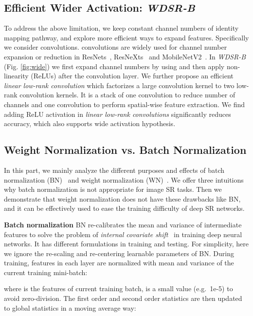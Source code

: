 \documentclass{article}
\begin{document}
\subsection{Efficient Wider Activation: \textit{WDSR-B}}
To address the above limitation, we keep constant channel numbers of identity mapping pathway, and explore more efficient ways to expand features. Specifically we consider  convolutions.  convolutions are widely used for channel number expansion or reduction in ResNets~\cite{he2016deep}, ResNeXts~\cite{xie2017aggregated} and MobileNetV2~\cite{2018arXiv180104381S}. In \textit{WDSR-B} (Fig. \ref{fig:wide}) we first expand channel numbers by using  and then apply non-linearity (ReLUs) after the convolution layer. We further propose an efficient \textit{linear low-rank convolution} which factorizes a large convolution kernel to two low-rank convolution kernels. It is a stack of one  convolution to reduce number of channels and one  convolution to perform spatial-wise feature extraction. We find adding ReLU activation in \textit{linear low-rank convolutions} significantly reduces accuracy, which also supports wide activation hypothesis.

\subsection{Weight Normalization vs. Batch Normalization}

In this part, we mainly analyze the different purposes and effects of batch normalization (BN)~\cite{ioffe2015batch} and weight normalization (WN)~\cite{salimans2016weight}. We offer three intuitions why batch normalization is not appropriate for image SR tasks. Then we demonstrate that weight normalization does not have these drawbacks like BN, and it can be effectively used to ease the training difficulty of deep SR networks.

\textbf{Batch normalization} BN re-calibrates the mean and variance of intermediate features to solve the problem of \textit{internal covariate shift}~\cite{ioffe2015batch} in training deep neural networks. It has different formulations in training and testing. For simplicity, here we ignore the re-scaling and re-centering learnable parameters of BN. During training, features in each layer are normalized with mean and variance of the current training mini-batch:

where  is the features of current training batch,  is a small value (e.g.\ 1e-5) to avoid zero-division. The first order and second order statistics are then updated to global statistics in a moving average way:
\end{document}
